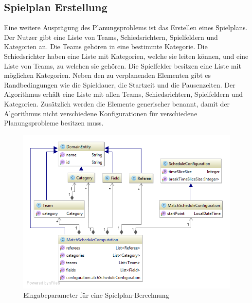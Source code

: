 %
%
%
%

\subsection{Spielplan Erstellung}
Eine weitere Ausprägung des Planungsproblems ist das Erstellen eines Spielplans. Der Nutzer gibt eine Liste von Teams, Schiedsrichtern, Spielfeldern und Kategorien an. Die Teams gehören in 
eine bestimmte Kategorie. Die Schiedsrichter haben eine Liste mit Kategorien, welche sie leiten können, und eine Liste von Teams, zu welchen sie gehören. Die Spielfelder besitzen eine Liste mit 
möglichen Kategorien. Neben den zu verplanenden Elementen gibt es Randbedingungen wie die Spieldauer, die Startzeit und die Pausenzeiten. Der Algorithmus erhält eine 
Liste mit allen Teams, Schiedsrichtern, Spielfeldern und Kategorien. Zusätzlich werden die Elemente generischer benannt, damit der Algorithmus nicht verschiedene Konfigurationen für 
verschiedene Planungsprobleme besitzen muss.

\begin{figure}[h]
\centering
\includegraphics[scale=0.5]{images/probleme/matchSchedule.png}
\caption[Eingabeparameter für eine Spielplan-Berechnung]{Eingabeparameter für eine Spielplan-Berechnung \selfmade{}}
\label{fig:matchschedule_input}
\end{figure}

\FloatBarrier

